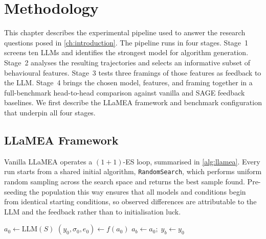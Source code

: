 
\chapter{Methodology}
\label{ch:methodology}

This chapter describes the experimental pipeline used to answer the research questions posed in \cref{ch:introduction}. The pipeline runs in four stages. Stage~1 screens ten LLMs and identifies the strongest model for algorithm generation. Stage~2 analyses the resulting trajectories and selects an informative subset of behavioural features. Stage~3 tests three framings of those features as feedback to the LLM. Stage~4 brings the chosen model, features, and framing together in a full-benchmark head-to-head comparison against vanilla and SAGE feedback baselines. We first describe the LLaMEA framework and benchmark configuration that underpin all four stages.

\section{LLaMEA Framework}
\label{sec:meth-llamea}

Vanilla LLaMEA operates a $(1 + 1)$-ES loop, summarised in \cref{alg:llamea}. Every run starts from a shared initial algorithm, \texttt{RandomSearch}, which performs uniform random sampling across the search space and returns the best sample found. Pre-seeding the population this way ensures that all models and conditions begin from identical starting conditions, so observed differences are attributable to the LLM and the feedback rather than to initialisation luck.

\begin{algorithm}[t]
\caption{$(1+1)$-LLaMEA evolutionary loop, adapted from \cite{vanStein2024LLaMEA}.}
\label{alg:llamea}
$a_0 \gets \text{LLM}(S)$\;
$(y_0, \sigma_0, e_0) \gets f(a_0)$\;
$a_b \gets a_0;\; y_b \gets y_0$\;
\end{algorithm}


